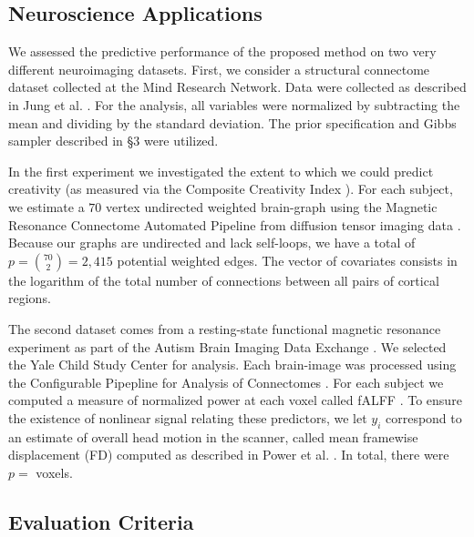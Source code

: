 \documentclass{article} %
\newcommand{\dd}[1]{{\color{blue}{\it #1}}}
\begin{document}



\subsection{Neuroscience Applications}

We assessed the predictive performance of the proposed method on two very different neuroimaging datasets. First, we consider a structural connectome dataset collected at the Mind Research Network.  Data were collected as described in Jung et al. \cite{Jung2010}. For the analysis, all variables were normalized by subtracting the mean and dividing by the standard deviation. The  prior specification and Gibbs sampler described in \S 3 were utilized. 

In the first experiment we investigated the extent to which we could predict creativity (as measured via the Composite Creativity Index \cite{Arden2010}).   For each subject, we estimate a $70$ vertex undirected weighted brain-graph using the Magnetic Resonance Connectome Automated Pipeline \cite{MRCAP11} from diffusion tensor imaging data \cite{Mori2006}. Because our graphs are undirected and lack self-loops, we have a total of $p=\binom{70}{2}=2,415$ potential weighted edges. The vector of covariates consists in the logarithm of the total number of connections between all pairs of cortical regions. 

The second dataset comes from a resting-state functional magnetic resonance experiment as part of the Autism Brain Imaging Data Exchange \cite{Autism}.  We selected the Yale Child Study Center for analysis.  Each brain-image was processed using the Configurable Pipepline for Analysis of Connectomes \cite{cpac}. For each subject we computed a measure of normalized power at each voxel called fALFF \cite{Zou2008}.  To ensure the existence of nonlinear signal relating these predictors, we let $y_i$ correspond to an estimate of overall head motion in the scanner, called mean framewise displacement (FD) computed as described in Power et al. \cite{power}. In total, there were $p=$\dd{??} voxels.

\subsection{Evaluation Criteria}
\end{document}
